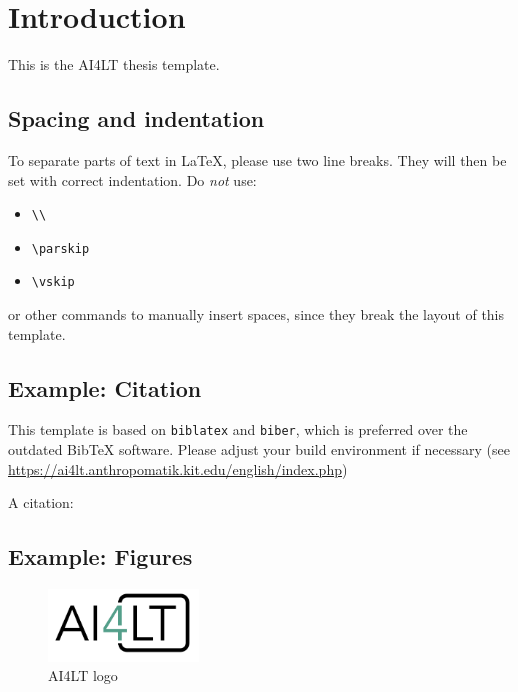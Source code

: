 
\chapter{Introduction}
\label{ch:Introduction}


This is the AI4LT thesis template.


\section{Spacing and indentation}
To separate parts of text in \LaTeX, please use two line breaks.
They will then be set with correct indentation.
Do \emph{not} use:
\begin{itemize}
  \itemsep0em
  \item \texttt{\textbackslash\textbackslash}
  \item \texttt{\textbackslash parskip}
  \item \texttt{\textbackslash vskip}
\end{itemize} 
or other commands to manually insert spaces, since they break the layout of this template.

\section{Example: Citation}
\label{sec:Introduction:Citation}
This template is based on \texttt{biblatex} and \texttt{biber}, which is preferred over the
outdated Bib\TeX{} software.
Please adjust your build environment if necessary (see
\url{https://ai4lt.anthropomatik.kit.edu/english/index.php})

A citation: \cite{becker2008a} 

\section{Example: Figures}
\label{sec:Introduction:Figures}
\begin{figure}
\centering
\includegraphics[width=4cm]{logos/AI4LT_logo.png}
\caption{AI4LT logo}
\label{fig:ai4ltlogo}
\end{figure}

